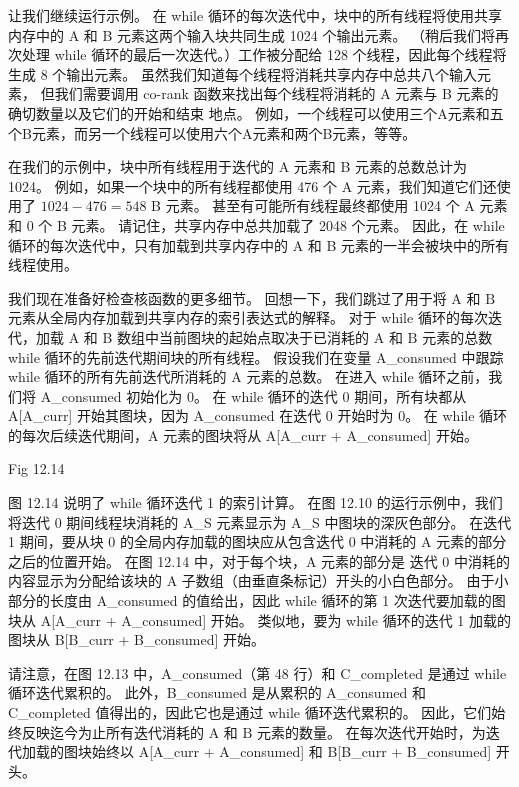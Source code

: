 让我们继续运行示例。 
在 while 循环的每次迭代中，块中的所有线程将使用共享内存中的 A 和 B 元素这两个输入块共同生成 1024 个输出元素。 
（稍后我们将再次处理 while 循环的最后一次迭代。）工作被分配给 128 个线程，因此每个线程将生成 8 个输出元素。 
虽然我们知道每个线程将消耗共享内存中总共八个输入元素，
但我们需要调用 co-rank 函数来找出每个线程将消耗的 A 元素与 B 元素的确切数量以及它们的开始和结束 地点。 
例如，一个线程可以使用三个A元素和五个B元素，而另一个线程可以使用六个A元素和两个B元素，等等。

在我们的示例中，块中所有线程用于迭代的 A 元素和 B 元素的总数总计为 1024。 
例如，如果一个块中的所有线程都使用 476 个 A 元素，我们知道它们还使用了 $1024-476=548$ B 元素。 
甚至有可能所有线程最终都使用 1024 个 A 元素和 0 个 B 元素。 请记住，共享内存中总共加载了 2048 个元素。 
因此，在 while 循环的每次迭代中，只有加载到共享内存中的 A 和 B 元素的一半会被块中的所有线程使用。

我们现在准备好检查核函数的更多细节。 
回想一下，我们跳过了用于将 $\mathrm{A}$ 和 $\mathrm{B}$ 元素从全局内存加载到共享内存的索引表达式的解释。 
对于 while 循环的每次迭代，加载 A 和 B 数组中当前图块的起始点取决于已消耗的 $\mathrm{A}$ 
和 $\mathrm{B}$ 元素的总数 while 循环的先前迭代期间块的所有线程。 
假设我们在变量 A\_consumed 中跟踪 while 循环的所有先前迭代所消耗的 A 元素的总数。 
在进入 while 循环之前，我们将 A\_consumed 初始化为 0。 
在 while 循环的迭代 0 期间，所有块都从 A[A\_curr] 开始其图块，因为 A\_consumed 在迭代 0 开始时为 0。 
在 while 循环的每次后续迭代期间，A 元素的图块将从 A[A\_curr + A\_consumed] 开始。

{\color{red} Fig 12.14}

图 12.14 说明了 while 循环迭代 1 的索引计算。 
在图 12.10 的运行示例中，我们将迭代 0 期间线程块消耗的 A\_S 元素显示为 A\_S 中图块的深灰色部分。 
在迭代 1 期间，要从块 0 的全局内存加载的图块应从包含迭代 0 中消耗的 A 元素的部分之后的位置开始。
在图 12.14 中，对于每个块，A 元素的部分是 迭代 0 中消耗的内容显示为分配给该块的 A 子数组（由垂直条标记）开头的小白色部分。 
由于小部分的长度由 A\_consumed 的值给出，因此 while 循环的第 1 次迭代要加载的图块从 A[A\_curr + A\_consumed] 开始。 
类似地，要为 while 循环的迭代 1 加载的图块从 B[B\_curr + B\_consumed] 开始。

请注意，在图 12.13 中，A\_consumed（第 48 行）和 C\_completed 是通过 while 循环迭代累积的。 
此外，B\_consumed 是从累积的 A\_consumed 和 C\_completed 值得出的，因此它也是通过 while 循环迭代累积的。 
因此，它们始终反映迄今为止所有迭代消耗的 $\mathrm{A}$ 和 $\mathrm{B}$ 元素的数量。 
在每次迭代开始时，为迭代加载的图块始终以 A[A\_curr + A\_consumed] 和 B[B\_curr + B\_consumed] 开头。

